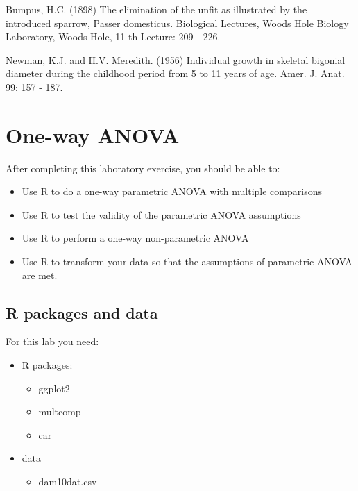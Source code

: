 \documentclass[
  12pt,
]{book}
\providecommand{\tightlist}{%
  \setlength{\itemsep}{0pt}\setlength{\parskip}{0pt}}
\begin{document}
Bumpus, H.C. (1898) The elimination of the unfit as illustrated by the introduced sparrow, Passer domesticus. Biological Lectures, Woods Hole Biology Laboratory, Woods Hole, 11 th Lecture: 209 - 226.

Newman, K.J. and H.V. Meredith. (1956) Individual growth in skeletal bigonial diameter during the childhood period from 5 to 11 years of age. Amer. J. Anat. 99: 157 - 187.

\hypertarget{one-way-anova}{%
\chapter{One-way ANOVA}\label{one-way-anova}}

After completing this laboratory exercise, you should be able to:

\begin{itemize}
\tightlist
\item
  Use R to do a one-way parametric ANOVA with multiple comparisons
\item
  Use R to test the validity of the parametric ANOVA assumptions
\item
  Use R to perform a one-way non-parametric ANOVA
\item
  Use R to transform your data so that the assumptions of parametric ANOVA are met.
\end{itemize}

\hypertarget{set-ano}{%
\section{R packages and data}\label{set-ano}}

For this lab you need:

\begin{itemize}
\tightlist
\item
  R packages:

  \begin{itemize}
  \tightlist
  \item
    ggplot2
  \item
    multcomp
  \item
    car
  \end{itemize}
\item
  data

  \begin{itemize}
  \tightlist
  \item
    dam10dat.csv
  \end{itemize}
\end{itemize}
\end{document}
